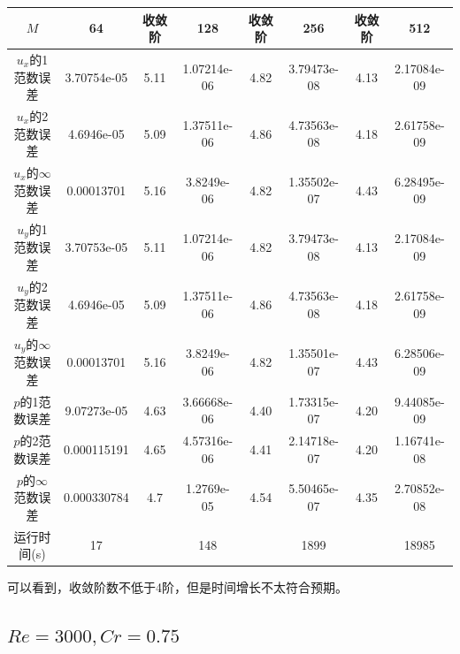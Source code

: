 \documentclass[lang=cn,10pt,bibend=bibtex]{elegantbook}
\begin{document}
\begin{table}[H]
  \centering
  \small
  \begin{tabular}{c|ccccccc}
  \textbf{$M$}              & 64          & 收敛阶 & 128         & 收敛阶 & 256         & 收敛阶 & 512   \\ \hline
  $u_x$的1范数误差 & 3.70754e-05 & 5.11 & 1.07214e-06 & 4.82 & 3.79473e-08 & 4.13 & 2.17084e-09\\
  $u_x$的2范数误差 & 4.6946e-05 & 5.09 & 1.37511e-06 & 4.86 & 4.73563e-08 & 4.18 & 2.61758e-09\\
  $u_x$的$\infty$范数误差 & 0.00013701 & 5.16 & 3.8249e-06 & 4.82 & 1.35502e-07 & 4.43 & 6.28495e-09\\
  $u_y$的1范数误差 & 3.70753e-05 & 5.11 & 1.07214e-06 & 4.82 & 3.79473e-08 & 4.13 & 2.17084e-09\\
  $u_y$的2范数误差 & 4.6946e-05 & 5.09 & 1.37511e-06 & 4.86 & 4.73563e-08 & 4.18 & 2.61758e-09\\
  $u_y$的$\infty$范数误差 & 0.00013701 & 5.16 & 3.8249e-06 & 4.82 & 1.35501e-07 & 4.43 & 6.28506e-09\\
  $p$的1范数误差 & 9.07273e-05 & 4.63 & 3.66668e-06 & 4.40 & 1.73315e-07 & 4.20 & 9.44085e-09\\
  $p$的2范数误差 & 0.000115191 & 4.65 & 4.57316e-06 & 4.41 & 2.14718e-07 & 4.20 & 1.16741e-08\\
  $p$的$\infty$范数误差 & 0.000330784 & 4.7 & 1.2769e-05 & 4.54 & 5.50465e-07 & 4.35 & 2.70852e-08\\  
  运行时间(s)                &      17      &       &     148      &       &     1899     &       &  18985
  \end{tabular}
\end{table}

可以看到，收敛阶数不低于4阶，但是时间增长不太符合预期。

\subsection{$Re=3000,Cr=0.75$}
\end{document}
